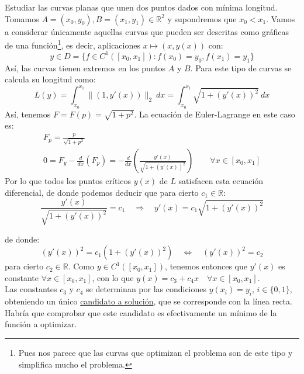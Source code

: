 \begin{ejemplo}
    Estudiar las curvas planas que unen dos puntos dados con mínima longitud.\\

    \noindent
    Tomamos $A = (x_0,y_0), B = (x_1,y_1) \in \mathbb{R}^2$ y supondremos que $x_0<x_1$. Vamos a considerar únicamente aquellas curvas que pueden ser descritas como gráficas de una función\footnote{Pues nos parece que las curvas que optimizan el problema son de este tipo y simplifica mucho el problema.}, es decir, aplicaciones $x\longmapsto (x,y(x))$ con:
    \begin{equation*}
        y \in  D = \{f\in C^1([x_0,x_1]) : f(x_0) = y_0, f(x_1) = y_1\}
    \end{equation*}
    Así, las curvas tienen extremos en los puntos $A$ y $B$. Para este tipo de curvas se calcula su longitud como:
    \begin{equation*}
        L(y) = \int_{x_0}^{x_1} \|(1,y'(x))\|_2~dx = \int_{x_0}^{x_1} \sqrt{1+{(y'(x))}^{2}}~dx 
    \end{equation*}
    Así, tenemos $F= F(p) = \sqrt{1+p^2}$. La ecuación de Euler-Lagrange en este caso es:
    \begin{gather*}
        F_p = \frac{p}{\sqrt{1+p^2}} \\
        0 = F_y - \frac{d}{dx}(F_p) = -\frac{d}{dx} \left(\frac{y'(x)}{\sqrt{1+{(y'(x))}^{2}}}\right) \qquad \forall x\in [x_0,x_1]
    \end{gather*}
    Por lo que todos los puntos críticos $y(x)$ de $L$ satisfacen esta ecuación diferencial, de donde podemos deducir que para cierto $c_1\in \mathbb{R}$:
    \begin{equation*}
        \frac{y'(x)}{\sqrt{1+{(y'(x))}^{2}}} = c_1  \quad\Longrightarrow\quad y'(x) = c_1\sqrt{1+{(y'(x))}^{2}}
    \end{equation*}
    
    de donde:
    \begin{equation*}
        {(y'(x))}^{2} = c_1 \left( 1+{(y'(x))}^{2} \right) \quad\Longleftrightarrow\quad {(y'(x))}^{2} = c_2
    \end{equation*}
    para cierto $c_2\in \mathbb{R}$. Como $y\in C^1([x_0,x_1])$, tenemos entonces que $y'(x)$ es constante $\forall x\in [x_0,x_1]$, con lo que $y(x) = c_3 + c_4x\quad \forall x\in [x_0,x_1]$.\\

    \noindent
    Las constantes $c_3$ y $c_4$ se determinan por las condiciones $y(x_i) = y_i$, $i \in \{0,1\}$, obteniendo un único \underline{candidato a solución}, que se corresponde con la línea recta. Habría que comprobar que este candidato es efectivamente un mínimo de la función a optimizar.
\end{ejemplo}

